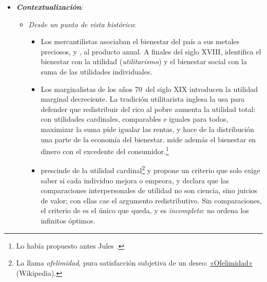 \documentclass[11pt]{article}
\begin{document}
\begin{itemize}
\begin{itemize}
  \item Es una de las partes del análisis económico más reconocidas: los premios Nobel de  (1972),  (1986),  (1998) y ,  y  (2007) premian aportaciones que se estudian en esta exposición\nocite{Nobel1972HicksArrow,Nobel1986Buchanan,Nobel1998Sen,Nobel2007HurwiczMaskinMyerson}.
  \end{itemize}

\item \textbf{\emph{Contextualización}}:
  \begin{itemize}
  \item \emph{Desde un punto de vista histórico}:
    \begin{itemize}
    \item Los mercantilistas asociaban el bienestar del país a sus metales preciosos, y \textcite{Smith1776Wealth}, al producto anual. A finales del siglo XVIII, \textcite{Bentham1789Introduction} identifica el bienestar con la utilidad (\emph{utilitarismo}) y el bienestar social con la suma de las utilidades individuales.
    \item Los marginalistas de los años 70~del siglo XIX introducen la utilidad marginal decreciente\nocite{Jevons1871Theory,Menger1871Grundsatze,Walras1874Elements}. La tradición utilitarista inglesa la usa para defender que redistribuir del rico al pobre aumenta la utilidad total: con utilidades cardinales, comparables e iguales para todos, maximizar la suma pide igualar las rentas\nocite{Edgeworth1897Pure}, y \textcite{Pigou1920Economics} hace de la distribución una parte de la economía del bienestar. \textcite{Marshall1890Principles} mide además el bienestar en dinero con el excedente del consumidor.\footnote{Lo había propuesto antes Jules \textcite{Dupuit1844Mesure} .}
    \item \textcite{Pareto1906Manuale} prescinde de la utilidad cardinal\footnote{La llama \emph{ofelimidad}, pura satisfacción subjetiva de un deseo: \href{https://es.wikipedia.org/wiki/Ofelimidad}{«Ofelimidad»} (Wikipedia).} y propone un criterio que solo exige saber si cada individuo mejora o empeora, y \textcite{Robbins1932Essay} declara que las comparaciones interpersonales de utilidad no son ciencia, sino juicios de valor; con ellas cae el argumento redistributivo\nocite{Robbins1935Essay}. Sin comparaciones, el criterio de  es el único que queda, y es \emph{incompleto}: no ordena los infinitos óptimos.

\end{itemize}
\end{itemize}
\end{itemize}
\end{document}
